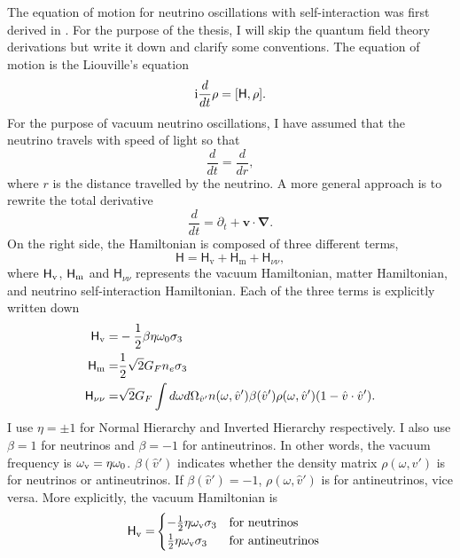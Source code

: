 The equation of motion for neutrino oscillations with self-interaction was first derived in \cite{Sigl1993}. For the purpose of the thesis, I will skip the quantum field theory derivations but write it down and clarify some conventions. The equation of motion is the Liouville's equation
\begin{equation}
   \ri \frac{d}{dt}\rho = [ \mathsf H,\rho].
   \label{chap:collective-sec:collective-eqn:equation-of-motion-general}
\end{equation}
For the purpose of vacuum neutrino oscillations, I have assumed that the neutrino travels with speed of light so that
\begin{equation}
   \frac{d}{dt} = \frac{d}{dr},
\end{equation}
where $r$ is the distance travelled by the neutrino. A more general approach is to rewrite the total derivative
\begin{equation}
   \frac{d}{dt} = \partial_t + \mathbf v\cdot \boldsymbol{\nabla}.
\end{equation}
On the right side, the Hamiltonian is composed of three different terms,
\begin{equation}
   \mathsf H = \mathsf H_{\mathrm v} + \mathsf H_{\mathrm m} +\mathsf  H_{\nu\nu},
\end{equation}
where $\mathsf H_\mathrm v$, $\mathsf H_\mathrm m$ and $\mathsf H_{\nu\nu}$ represents the vacuum Hamiltonian, matter Hamiltonian, and neutrino self-interaction Hamiltonian. Each of the three terms is explicitly written down
\begin{align}
    \mathsf H_\mathrm v =& -\frac{1}{2}\beta\eta \omega_0 \sigma_3\\
    \mathsf H_\mathrm m =& \frac{1}{2} \sqrt{2}G_F n_e \sigma_3 \\
    \mathsf H_{\nu\nu} =& \sqrt{2}G_F \int d\omega d\Omega_{\hat v'} n(\omega,\hat v')\beta(\hat v')\rho(\omega,\hat v') (1-\hat v \cdot \hat v').
\end{align}
I use $\eta=\pm 1$ for Normal Hierarchy and Inverted Hierarchy respectively. I also use $\beta=1$ for neutrinos and $\beta=-1$ for antineutrinos. In other words, the vacuum frequency is $\omega_\mathrm v = \eta \omega_0$. $\beta(\hat v')$ indicates whether the density matrix $\rho(\omega,\hat v')$ is for neutrinos or antineutrinos. If $\beta(\hat v')=-1$, $\rho(\omega,\hat v')$ is for antineutrinos, vice versa. More explicitly, the vacuum Hamiltonian is
\begin{align*}
   \mathsf H_\mathrm v =& \begin{cases}
   -\frac{1}{2}\eta \omega_\mathrm v \sigma_3 & \text{for neutrinos}\\
   \frac{1}{2}\eta \omega_\mathrm v \sigma_3 & \text{for antineutrinos}
   \end{cases}
\end{align*}
